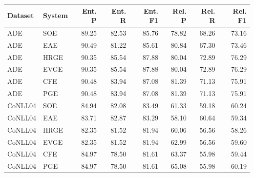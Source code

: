 \begin{tabular}{llrrrrrr}
\toprule
Dataset & System & Ent. P & Ent. R & Ent. F1 & Rel. P & Rel. R & Rel. F1 \\
\midrule
ADE & SOE & 89.25 & 82.53 & 85.76 & 78.82 & 68.26 & 73.16 \\
ADE & EAE & 90.49 & 81.22 & 85.61 & 80.84 & 67.30 & 73.46 \\
ADE & HRGE & 90.35 & 85.54 & 87.88 & 80.04 & 72.89 & 76.29 \\
ADE & EVGE & 90.35 & 85.54 & 87.88 & 80.04 & 72.89 & 76.29 \\
ADE & CFE & 90.48 & 83.94 & 87.08 & 81.39 & 71.13 & 75.91 \\
ADE & PGE & 90.48 & 83.94 & 87.08 & 81.39 & 71.13 & 75.91 \\
CoNLL04 & SOE & 84.94 & 82.08 & 83.49 & 61.33 & 59.18 & 60.24 \\
CoNLL04 & EAE & 83.71 & 82.87 & 83.29 & 58.10 & 60.64 & 59.34 \\
CoNLL04 & HRGE & 82.35 & 81.52 & 81.94 & 60.06 & 56.56 & 58.26 \\
CoNLL04 & EVGE & 82.35 & 81.52 & 81.94 & 62.99 & 56.56 & 59.60 \\
CoNLL04 & CFE & 84.97 & 78.50 & 81.61 & 63.37 & 55.98 & 59.44 \\
CoNLL04 & PGE & 84.97 & 78.50 & 81.61 & 65.08 & 55.98 & 60.19 \\
\bottomrule
\end{tabular}
